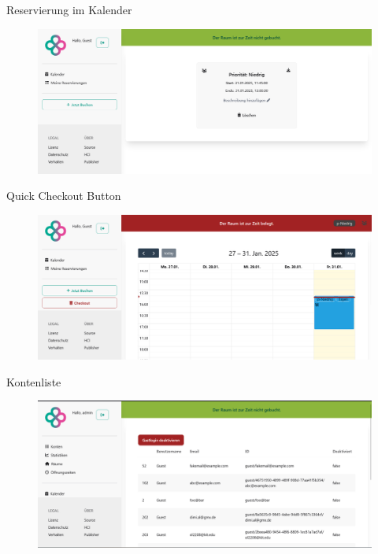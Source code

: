 \documentclass{sdqbeamer}
\begin{document}
    \begin{frame}{Reservierung im Kalender}
        \thispagestyle{plain}
        \begin{figure}
            \centering
            \includegraphics[width=1\linewidth]{bookings_single.png}
            \label{fig:enter-label}
        \end{figure}
    \end{frame}
    
    \begin{frame}{Quick Checkout Button}
        \thispagestyle{plain}
        \begin{figure}
            \centering
            \includegraphics[width=1\linewidth]{check_out_button_light.png}
            \label{fig:enter-label}
        \end{figure}
    \end{frame}
    
    \begin{frame}{Kontenliste}
        \thispagestyle{plain}
        \begin{figure}
            \centering
            \includegraphics[width=1\linewidth]{admin_users.png}
            \label{fig:enter-label}
        \end{figure}
        
    \end{frame}
    
\end{document}
